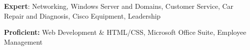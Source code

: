 \textbf{Expert}: Networking, Windows Server and Domains, Customer Service, Car Repair and Diagnosis, Cisco Equipment, Leadership

\textbf{Proficient:} Web Development \& HTML/CSS, Microsoft Office Suite, Employee Management
